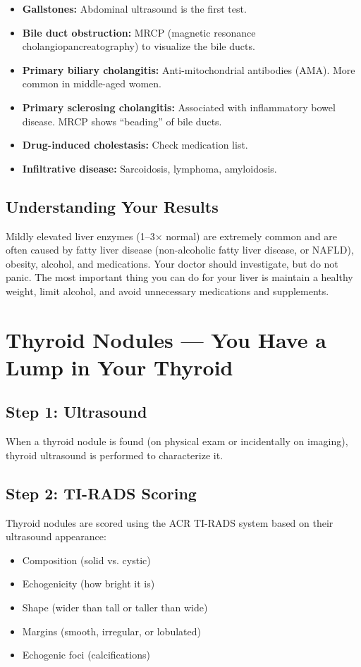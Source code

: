 \begin{itemize}
    \item \textbf{Gallstones:} Abdominal ultrasound is the first test.
    \item \textbf{Bile duct obstruction:} MRCP (magnetic resonance cholangiopancreatography) to visualize the bile ducts.
    \item \textbf{Primary biliary cholangitis:} Anti-mitochondrial antibodies (AMA). More common in middle-aged women.
    \item \textbf{Primary sclerosing cholangitis:} Associated with inflammatory bowel disease. MRCP shows ``beading'' of bile ducts.
    \item \textbf{Drug-induced cholestasis:} Check medication list.
    \item \textbf{Infiltrative disease:} Sarcoidosis, lymphoma, amyloidosis.
\end{itemize}

\subsection{Understanding Your Results}

Mildly elevated liver enzymes (1--3$\times$ normal) are extremely common and are often caused by fatty liver disease (non-alcoholic fatty liver disease, or NAFLD), obesity, alcohol, and medications. Your doctor should investigate, but do not panic. The most important thing you can do for your liver is maintain a healthy weight, limit alcohol, and avoid unnecessary medications and supplements.

\clearpage
\section{Thyroid Nodules --- You Have a Lump in Your Thyroid}

\subsection{Step 1: Ultrasound}

When a thyroid nodule is found (on physical exam or incidentally on imaging), thyroid ultrasound is performed to characterize it.

\subsection{Step 2: TI-RADS Scoring}

Thyroid nodules are scored using the ACR TI-RADS system based on their ultrasound appearance:
\begin{itemize}
    \item Composition (solid vs. cystic)
    \item Echogenicity (how bright it is)
    \item Shape (wider than tall or taller than wide)
    \item Margins (smooth, irregular, or lobulated)
    \item Echogenic foci (calcifications)
\end{itemize}

